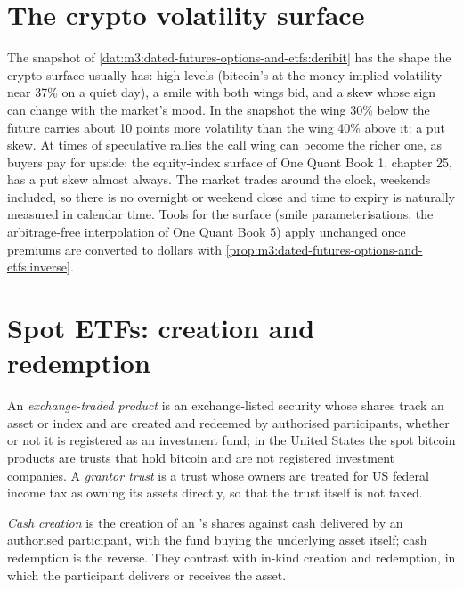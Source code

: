 \section{The crypto volatility surface}

The snapshot of \cref{dat:m3:dated-futures-options-and-etfs:deribit} has the shape the crypto surface usually has: high levels
(bitcoin's at-the-money implied volatility near 37\% on a quiet day), a smile with both wings bid, and a skew whose sign can
change with the market's mood. In the snapshot the wing 30\% below the future carries about 10 points more volatility than the
wing 40\% above it: a put skew. At times of speculative rallies the call wing can become the richer one, as buyers pay for upside; the
equity-index surface of One Quant Book 1, chapter 25, has a put skew almost always. The market trades around the clock, weekends
included, so there is no overnight or weekend close and time to expiry is naturally measured in calendar time.
Tools for the surface (smile parameterisations, the arbitrage-free interpolation of One Quant Book 5) apply unchanged once premiums are
converted to dollars with \cref{prop:m3:dated-futures-options-and-etfs:inverse}.

\section{Spot ETFs: creation and redemption}

\begin{definition}\label{def:m3:dated-futures-options-and-etfs:etp}
An \emph{exchange-traded product} is an exchange-listed security whose shares track an asset or index
and are created and redeemed by authorised participants, whether or not it is registered as an investment fund; in the United States
the spot bitcoin products are trusts that hold bitcoin and are not registered investment companies. A \emph{grantor
trust} is a trust whose owners are treated for US federal income tax as owning its assets directly, so that the
trust itself is not taxed.
\end{definition}

\begin{definition}\label{def:m3:dated-futures-options-and-etfs:cash}
\emph{Cash creation} is the creation of an 's shares against cash delivered by an
authorised participant, with the fund buying the underlying asset itself; cash redemption is the reverse. They contrast with in-kind
creation and redemption, in which the participant delivers or receives the asset.
\end{definition}

